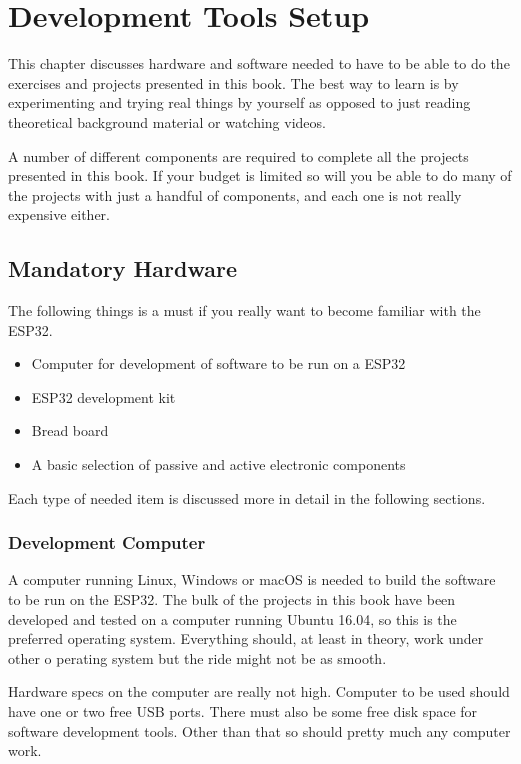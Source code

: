 \documentclass{tufte-book}
\begin{document}
\chapter{Development Tools Setup}

This chapter discusses hardware and software needed to have to be able to do 
the exercises and projects presented in this book. The best way to learn is by 
experimenting and trying real things by yourself as opposed to just reading 
theoretical background material or watching videos.

A number of different components are required to complete all the projects 
presented in this book. If your budget is limited so will you be able to do 
many of the projects with just a handful of components, and each one is not 
really expensive either.

\section{Mandatory Hardware}\label{sec:hardware}
The following things is a must if you really want to become familiar with the ESP32.

\begin{itemize}
	\item Computer for development of software to be run on a ESP32
	\item ESP32 development kit
	\item Bread board
	\item A basic selection of passive and active electronic components
\end{itemize}

Each type of needed item is discussed more in detail in the following sections.

\subsection{Development Computer}
A computer running Linux, Windows or macOS is needed to build the software to 
be run on the ESP32. The bulk of the projects in this book have been developed 
and tested on a computer running Ubuntu 16.04, so this is the preferred 
operating system. Everything should, at least in theory, work under other o
perating system but the ride might not be as smooth.

Hardware specs on the computer are really not high. Computer to be used should 
have one or two free USB ports. There must also be some free disk space for 
software development tools. Other than that so should pretty much any computer 
work.
\end{document}
